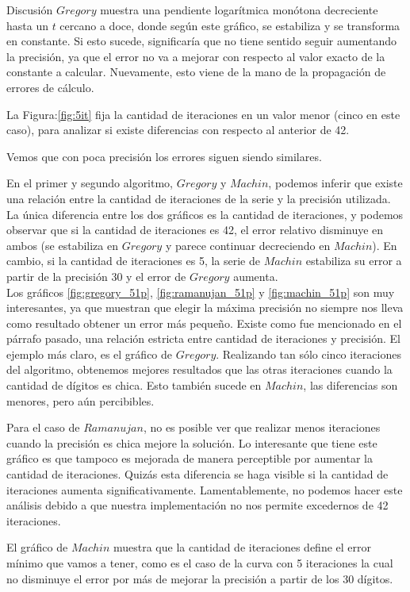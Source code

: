 \begin{section}{Discusión}
	$Gregory$ muestra una pendiente logarítmica monótona decreciente hasta un $t$ cercano a doce, donde según este gráfico, se estabiliza y se transforma en constante. Si esto sucede, significaría que no tiene sentido seguir aumentando la precisión, ya que el error no va a mejorar con respecto al valor exacto de la constante a calcular. Nuevamente, esto viene de la mano de la propagación de errores de cálculo.
	
	La Figura:\ref{fig:5it} fija la cantidad de iteraciones en un valor menor (cinco en este caso), para analizar si existe diferencias con respecto al anterior de 42.
	
	Vemos que con poca precisión los errores siguen siendo similares.
	
	En el primer y segundo algoritmo, $Gregory$ y $Machin$, podemos inferir que existe una relación entre la cantidad de iteraciones de la serie y la precisión utilizada. La única diferencia entre los dos gráficos es la cantidad de iteraciones, y podemos observar que si la cantidad de iteraciones es 42, el error relativo disminuye en ambos (se estabiliza en $Gregory$ y parece continuar decreciendo en $Machin$). En cambio, si la cantidad de iteraciones es 5, la serie de $Machin$ estabiliza su error a partir de la precisión 30 y el error de $Gregory$ aumenta. \\
	
	Los gráficos \ref{fig:gregory_51p}, \ref{fig:ramanujan_51p} y \ref{fig:machin_51p} son muy interesantes, ya que muestran que elegir la máxima precisión no siempre nos lleva como resultado obtener un error más pequeño. Existe como fue mencionado en el párrafo pasado, una relación estricta entre cantidad de iteraciones y precisión. El ejemplo más claro, es el gráfico de $Gregory$. Realizando tan sólo cinco iteraciones del algoritmo, obtenemos mejores resultados que las otras iteraciones cuando la cantidad de dígitos es chica. Esto también sucede en $Machin$, las diferencias son menores, pero aún percibibles.
	
	Para el caso de $Ramanujan$, no es posible ver que realizar menos iteraciones cuando la precisión es chica mejore la solución. Lo interesante que tiene este gráfico es que tampoco es mejorada de manera perceptible por aumentar la cantidad de iteraciones. Quizás esta diferencia se haga visible si la cantidad de iteraciones aumenta significativamente. Lamentablemente, no podemos hacer este análisis debido a que nuestra implementación no nos permite excedernos de 42 iteraciones.
	
	El gráfico de $Machin$ muestra que la cantidad de iteraciones define el error mínimo que vamos a tener, como es el caso de la curva con 5 iteraciones la cual no disminuye el error por más de mejorar la precisión a partir de los 30 dígitos. 
	

\end{section}
